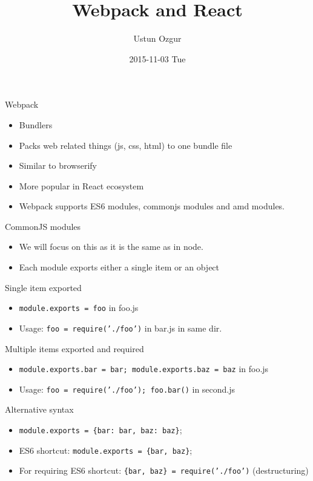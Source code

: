 \documentclass[presentation]{beamer}
\author{Ustun Ozgur}
\date{2015-11-03 Tue}
\title{Webpack and React}
\begin{document}
\maketitle

\begin{frame}[label={sec:orgheadline1}]{Webpack}
\begin{itemize}
\item Bundlers
\item Packs web related things (js, css, html) to one bundle file
\item Similar to browserify
\item More popular in React ecosystem
\item Webpack supports ES6 modules, commonjs modules and amd modules.
\end{itemize}
\end{frame}

\begin{frame}[label={sec:orgheadline2}]{CommonJS modules}
\begin{itemize}
\item We will focus on this as it is the same as in node.
\item Each module exports either a single item or an object
\end{itemize}
\end{frame}

\begin{frame}[fragile,label={sec:orgheadline3}]{Single item exported}
 \begin{itemize}
\item \texttt{module.exports = foo} in foo.js
\item Usage: \texttt{foo = require('./foo')} in bar.js in same dir.
\end{itemize}
\end{frame}

\begin{frame}[fragile,label={sec:orgheadline4}]{Multiple items exported and required}
 \begin{itemize}
\item \texttt{module.exports.bar = bar; module.exports.baz = baz} in foo.js
\item Usage: \texttt{foo = require('./foo'); foo.bar()} in second.js
\end{itemize}
\end{frame}

\begin{frame}[fragile,label={sec:orgheadline5}]{Alternative syntax}
 \begin{itemize}
\item \texttt{module.exports = \{bar: bar, baz: baz\}};

\item ES6 shortcut: \texttt{module.exports = \{bar, baz\}};

\item For requiring ES6 shortcut: \texttt{\{bar, baz\} = require('./foo')} (destructuring)
\end{itemize}
\end{frame}
\end{document}
